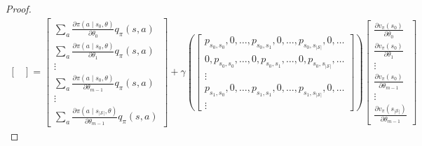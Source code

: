 ﻿\documentclass[11pt, a4paper]{report}
\begin{document}
\begin{proof}
\begin{align*}
\begin{bmatrix}
\end{bmatrix}
=
\begin{bmatrix}
\sum_a \frac{\partial \pi(a \mid s_0, \theta)}{\partial \theta_0} q_{\pi}(s, a) \\
\sum_a \frac{\partial \pi(a \mid s_0, \theta)}{\partial \theta_1} q_{\pi}(s, a) \\
\vdots \\
\sum_a \frac{\partial \pi(a \mid s_0, \theta)}{\partial \theta_{m-1}} q_{\pi}(s, a) \\
\vdots \\
\sum_a \frac{\partial \pi(a \mid s_{|\mathcal{S}|}, \theta)}{\partial \theta_{m-1}} q_{\pi}(s, a)
\end{bmatrix}
+ \gamma \left(
\begin{bmatrix}
p_{s_0, s_0}, 0, \dots, p_{s_0, s_1}, 0, \dots, p_{s_0, s_{|\mathcal{S}|}}, 0, \dots \\
0, p_{s_0, s_0}, \dots, 0, p_{s_0, s_1}, \dots, 0, p_{s_0, s_{|\mathcal{S}|}}, \dots \\
\vdots \\
p_{s_1, s_0}, 0, \dots, p_{s_1, s_1}, 0, \dots, p_{s_1, s_{|\mathcal{S}|}}, 0, \dots \\
\vdots
\end{bmatrix}
\right)
\begin{bmatrix}
\frac{\partial v_{\pi}(s_0)}{\partial \theta_0} \\
\frac{\partial v_{\pi}(s_0)}{\partial \theta_1} \\
\vdots \\
\frac{\partial v_{\pi}(s_0)}{\partial \theta_{m-1}} \\
\vdots \\
\frac{\partial v_{\pi}(s_{|\mathcal{S}|})}{\partial \theta_{m-1}}
\end{bmatrix}
\end{align*}


\end{proof}
\end{document}
